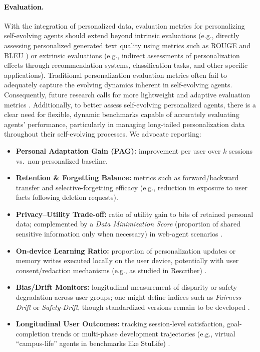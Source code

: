 \paragraph{Evaluation.}
With the integration of personalized data, evaluation metrics for personalizing self-evolving agents should extend beyond intrinsic evaluations (e.g., directly assessing personalized generated text quality using metrics such as ROUGE \citep{lin2004rouge} and BLEU \citep{papineni2002bleu}) or extrinsic evaluations (e.g., indirect assessments of personalization effects through recommendation systems, classification tasks, and other specific applications). Traditional personalization evaluation metrics often fail to adequately capture the evolving dynamics inherent in self-evolving agents. Consequently, future research calls for more lightweight and adaptive evaluation metrics \citep{zhang2024personalization}. Additionally, to better assess self-evolving personalized agents, there is a clear need for flexible, dynamic benchmarks capable of accurately evaluating agents' performance, particularly in managing long-tailed personalization data throughout their self-evolving processes. We advocate reporting: 
\begin{itemize}
\item \textbf{Personal Adaptation Gain (PAG):} improvement per user over $k$ sessions vs.\ non-personalized baseline.

\item \textbf{Retention \& Forgetting Balance:} metrics such as forward/backward transfer and selective-forgetting efficacy (e.g., reduction in exposure to user facts following deletion requests). 

\item \textbf{Privacy–Utility Trade-off:} ratio of utility gain to bits of retained personal data; complemented by a \emph{Data Minimization Score} (proportion of shared sensitive information only when necessary) in web-agent scenarios \citep{zharmagambetov2025agentdam}.

\item \textbf{On-device Learning Ratio:} proportion of personalization updates or memory writes executed locally on the user device, potentially with user consent/redaction mechanisms (e.g., as studied in Rescriber) \citep{zhou2025rescriber}.  

\item \textbf{Bias/Drift Monitors:} longitudinal measurement of disparity or safety degradation across user groups; one might define indices such as \emph{Fairness-Drift} or \emph{Safety-Drift}, though standardized versions remain to be developed \citep{basu2025fair,shao2025misevolution}.  

\item \textbf{Longitudinal User Outcomes:} tracking session-level satisfaction, goal-completion trends or multi-phase development trajectories (e.g., virtual “campus-life” agents in benchmarks like StuLife) \citep{cai2025building}.  

\end{itemize}





